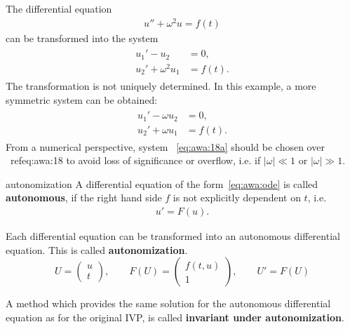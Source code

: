 \begin{example}
  \label{ex:awa:sine-1}
  The differential equation
  \begin{gather}
    \label{eq:awa:17}
    u'' + \omega^2 u = f(t)
  \end{gather}
  can be transformed into the system
  \begin{gather}
    \label{eq:awa:18}
    \begin{split}
      u_1' - u_2 &= 0, \\
      u_2' + \omega^2 u_1 &= f(t).
    \end{split}
  \end{gather}
  The transformation is not uniquely determined. In this example, a
  more symmetric system can be obtained:
  \begin{gather}
    \label{eq:awa:18a}
    \begin{split}
      u_1' - \omega u_2 &= 0, \\
      u_2' + \omega u_1 &= f(t).
    \end{split}
  \end{gather}
  From a numerical perspective, system ~\ref{eq:awa:18a} should be
  chosen over ~ref{eq:awa:18} to avoid loss of significance or overflow,
  i.e. if $|\omega| \ll 1$ or $|\omega| \gg 1$.
\end{example}

\begin{Definition}{autonomization}
  A differential equation of the form~\eqref{eq:awa:ode} is called
  \textbf{autonomous},  if
  the right hand side $f$ is not explicitly dependent on $t$, i.e.
  \begin{gather}
    u'=F(u).
  \end{gather}

  Each differential equation can be transformed into an autonomous
  differential equation.  This is called
  \textbf{autonomization}. 
  \begin{equation*}
    U = \begin{pmatrix} u \\ t \end{pmatrix},
    \qquad
    F(U) = \begin{pmatrix} f(t,u) \\ 1 \end{pmatrix},
    \qquad
    U' = F(U)
  \end{equation*}

  A method which provides the same solution for the autonomous
  differential equation as for the original IVP, is called
  \textbf{invariant under autonomization}.
\end{Definition}


